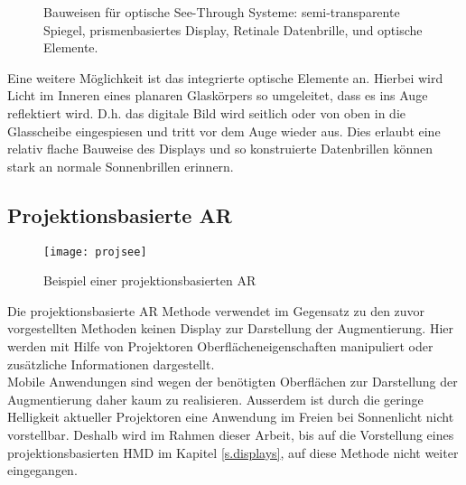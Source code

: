 \subfiglabelskip=0pt
\begin{figure}[h]%
	\centering
	\hspace{8pt}%
	
	\hspace{8pt}%
	\caption[Bauweisen für See-Through Systeme.]
	{Bauweisen für optische See-Through Systeme:
		 semi-transparente Spiegel,
		 prismenbasiertes Display,
		 Retinale Datenbrille, und
		 optische Elemente.}%
	\label{fig:see}%
\end{figure}
Eine weitere Möglichkeit ist das integrierte optische Elemente an. Hierbei wird Licht im Inneren eines planaren Glaskörpers so umgeleitet, dass es ins Auge reflektiert wird. D.h. das digitale Bild wird seitlich oder von oben in die Glasscheibe eingespiesen und tritt vor dem Auge wieder aus. Dies erlaubt eine relativ flache Bauweise des Displays und so konstruierte Datenbrillen können stark an normale Sonnenbrillen erinnern.\cite[S.~273~ff.]{doerner13}
\newpage
\subsection*{Projektionsbasierte AR}
\begin{wrapfigure}{r}{0.45\textwidth}
	\vspace{-25pt}
	\begin{center}
		\texttt{[image: projsee]}
	\end{center}
	\vspace{-15pt}
	\captionsetup{width=0.38\textwidth}
	\caption{Beispiel einer projektionsbasierten AR}\label{projsee}
	\vspace{-15pt}
\end{wrapfigure}
Die projektionsbasierte AR Methode verwendet im Gegensatz zu den zuvor vorgestellten Methoden keinen Display zur Darstellung der Augmentierung. Hier werden mit Hilfe von Projektoren Oberflächeneigenschaften manipuliert oder zusätzliche Informationen dargestellt.\cite[S.~249]{doerner13}\\[6pt]
Mobile Anwendungen sind wegen der benötigten Oberflächen zur Darstellung der Augmentierung daher kaum zu realisieren. Ausserdem ist durch die geringe Helligkeit aktueller Projektoren eine Anwendung im Freien bei Sonnenlicht nicht vorstellbar. Deshalb wird im Rahmen dieser Arbeit, bis auf die Vorstellung eines projektionsbasierten HMD im Kapitel \ref{s.displays}, auf diese Methode nicht weiter eingegangen.\\[6pt]
\newpage

